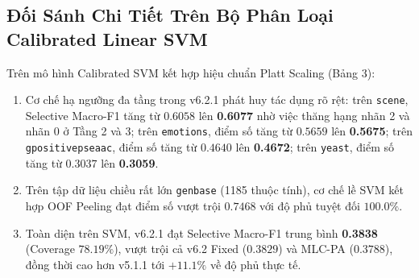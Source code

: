 \documentclass[10pt,a4paper,twoside]{article}
\begin{document}
\subsection{Đối Sánh Chi Tiết Trên Bộ Phân Loại Calibrated Linear SVM}
Trên mô hình Calibrated SVM kết hợp hiệu chuẩn Platt Scaling (Bảng 3):
\begin{enumerate}[leftmargin=*]
    \item Cơ chế hạ ngưỡng đa tầng trong v6.2.1 phát huy tác dụng rõ rệt: trên \texttt{scene}, Selective Macro-F1 tăng từ $0.6058$ lên \textbf{0.6077} nhờ việc thăng hạng nhãn 2 và nhãn 0 ở Tầng 2 và 3; trên \texttt{emotions}, điểm số tăng từ $0.5659$ lên \textbf{0.5675}; trên \texttt{gpositivepseaac}, điểm số tăng từ $0.4640$ lên \textbf{0.4672}; trên \texttt{yeast}, điểm số tăng từ $0.3037$ lên \textbf{0.3059}.
    \item Trên tập dữ liệu chiều rất lớn \texttt{genbase} (1185 thuộc tính), cơ chế lề SVM kết hợp OOF Peeling đạt điểm số vượt trội $0.7468$ với độ phủ tuyệt đối $100.0\%$.
    \item Toàn diện trên SVM, v6.2.1 đạt Selective Macro-F1 trung bình \textbf{0.3838} (Coverage $78.19\%$), vượt trội cả v6.2 Fixed ($0.3829$) và MLC-PA ($0.3788$), đồng thời cao hơn v5.1.1 tới $+11.1\%$ về độ phủ thực tế.
\end{enumerate}
\end{document}
